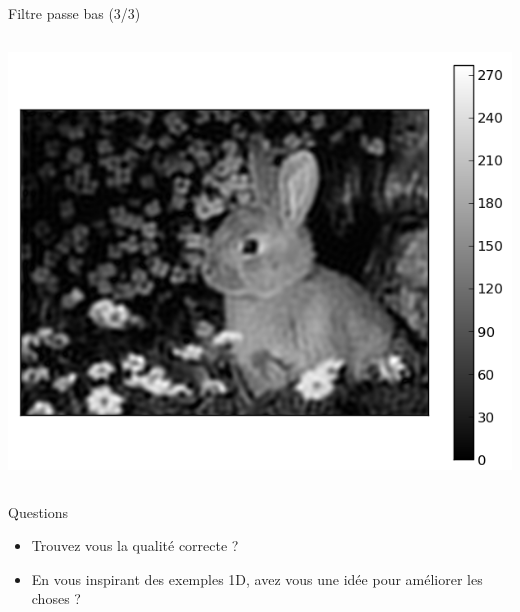 \documentclass[8pt,a4paper]{beamer}
\begin{document}
\begin{frame}{Filtre passe bas (3/3)}
 \begin{columns}
\includegraphics[width=1.\textwidth]{figures/lapin_lowpass3.png}

\end{columns}
\begin{alertblock}{Questions}
\begin{itemize}
\item Trouvez vous la qualité correcte ?
\item En vous inspirant des exemples 1D, avez vous une idée pour améliorer les choses ?
\end{itemize}
\end{alertblock}
\end{frame}
\end{document}
